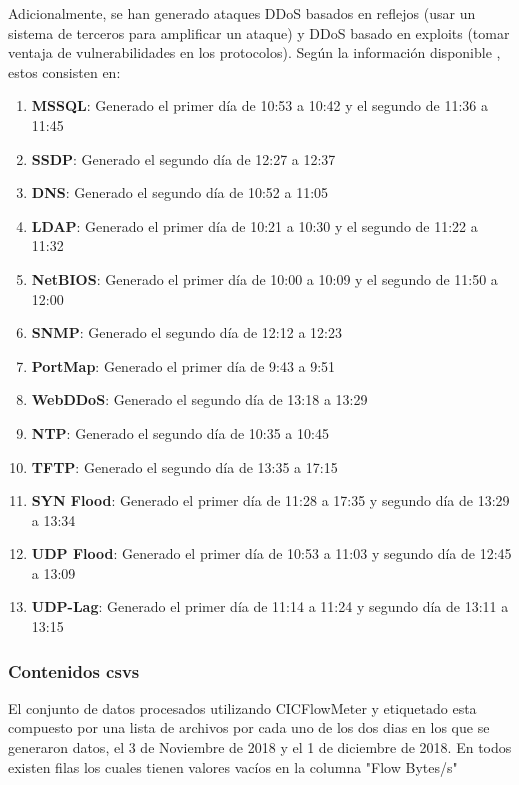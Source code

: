 Adicionalmente, se han generado ataques DDoS basados en reflejos (usar un sistema de terceros para amplificar un ataque) y DDoS basado en exploits (tomar ventaja de vulnerabilidades en los protocolos). Según la información disponible \cite{cicddos2019web}, estos consisten en:

\begin{enumerate}
    \item \textbf{MSSQL}: Generado el primer día de 10:53 a 10:42 y el segundo de 11:36 a 11:45
    \item \textbf{SSDP}: Generado el segundo día de 12:27 a 12:37
    \item \textbf{DNS}: Generado el segundo día de 10:52 a 11:05
    \item \textbf{LDAP}: Generado el primer día de 10:21 a 10:30 y el segundo de 11:22 a 11:32
    \item \textbf{NetBIOS}: Generado el primer día de 10:00 a 10:09 y el segundo de 11:50 a 12:00
    \item \textbf{SNMP}: Generado el segundo día de 12:12 a 12:23
    \item \textbf{PortMap}: Generado el primer día de 9:43 a 9:51
    \item \textbf{WebDDoS}: Generado el segundo día de 13:18 a 13:29
    \item \textbf{NTP}: Generado el segundo día de 10:35 a 10:45
    \item \textbf{TFTP}: Generado el segundo día de 13:35 a 17:15
    \item \textbf{SYN Flood}: Generado el primer día de 11:28 a 17:35 y segundo día de 13:29 a 13:34
    \item \textbf{UDP Flood}: Generado el primer día de 10:53 a 11:03 y segundo día de 12:45 a 13:09
    \item \textbf{UDP-Lag}: Generado el primer día de 11:14 a 11:24 y segundo día de 13:11 a 13:15
\end{enumerate}

\subsubsection{Contenidos csvs}

El conjunto de datos procesados utilizando CICFlowMeter y etiquetado esta compuesto por una lista de archivos por cada uno de los dos dias en los que se generaron datos, el 3 de Noviembre de 2018 y el 1 de diciembre de 2018. En todos existen filas los cuales tienen valores vacíos en la columna "Flow Bytes/s"

